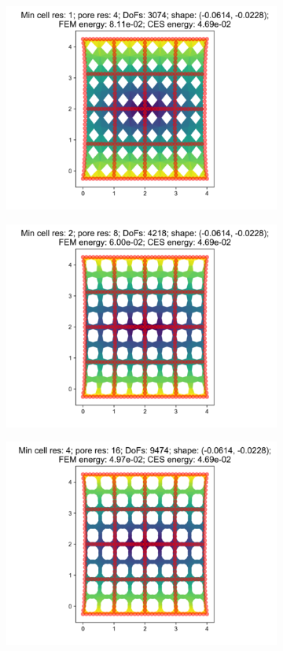 \begin{figure}[H]
\begin{subfigure}{.45\textwidth}
  \centering
  \includegraphics[width=.8\linewidth]{lces/vis_tension/bm_6_mesh_0.png}
\end{subfigure}
\begin{subfigure}{.45\textwidth}
  \centering
  \includegraphics[width=.8\linewidth]{lces/vis_tension/bm_6_mesh_1.png}
\end{subfigure}
\newline
\begin{subfigure}{.45\textwidth}
  \centering
  \includegraphics[width=.8\linewidth]{lces/vis_tension/bm_6_mesh_2.png}

\end{subfigure}
\end{figure}
